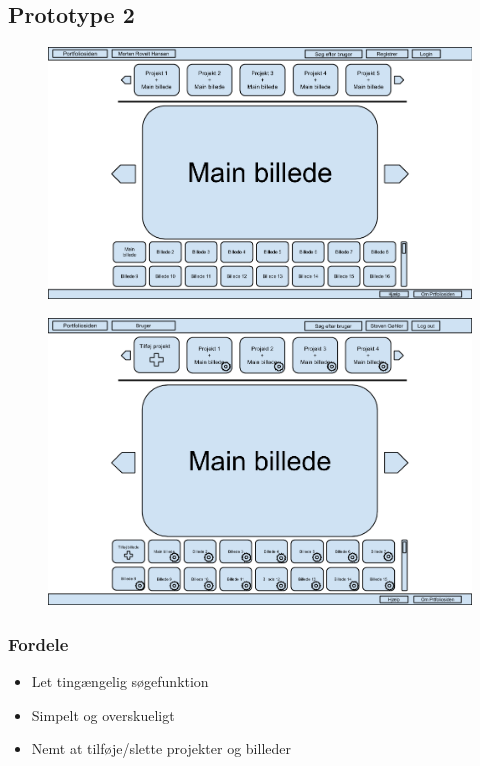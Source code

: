 \documentclass[a4paper,titlepage,fleqn,12pt]{article}
\begin{document}
\subsection{Prototype 2}

\begin{figure}[H]
	\includegraphics[width=\textwidth]{Prototype_1_not_logged_in.png}
\end{figure}

\begin{figure}[H]
	\includegraphics[width=\textwidth]{Prototype_1_logged_in.png}
\end{figure}

\subsubsection{Fordele}
\begin{itemize}
	\item Let tingængelig søgefunktion
	\item Simpelt og overskueligt
	\item Nemt at tilføje/slette projekter og billeder
\end{itemize}
\end{document}
